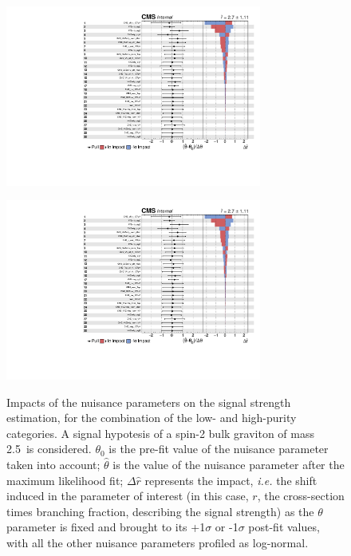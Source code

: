 \begin{figure}[!h]
   \caption{Impacts of the nuisance parameters on the signal strength estimation, for the combination of the low- and high-purity categories. A signal hypotesis of a spin-2 bulk graviton of mass 2.5~\TeV is considered. $\theta_0$ is the pre-fit value of the nuisance parameter taken into account; $\hat{\theta}$ is the value of the nuisance parameter after the maximum likelihood fit; $\Delta \hat{r}$ represents the impact, \textit{i.e.} the shift induced in the parameter of interest (in this case, $r$, the cross-section times branching fraction, describing the signal strength) as the $\theta$ parameter is fixed and brought to its +1$\sigma$ or -1$\sigma$ post-fit values, with all the other nuisance parameters profiled as log-normal.}
 \begin{center}
   \includegraphics[width=0.75\textwidth]{impacts_VZ_data_1fb/impacts_XZZInv_XVZnn_M2500.pdf}

   \includegraphics[page=2, width=0.75\textwidth]{impacts_VZ_data_1fb/impacts_XZZInv_XVZnn_M2500.pdf}
   \label{fig:impacts}
 \end{center}
\end{figure}


